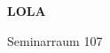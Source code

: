 \documentclass[a4paper]{article}
\begin{document}
\printGenericVSLHeader
\begin{center}
\begin{vsltext}{3cm}{4cm}

   \vspace{0.5cm} 

    \textbf{LOLA} 

    \vspace{1.5cm}

    Seminarraum 107

\end{vsltext}

\end{center}
\end{document}
